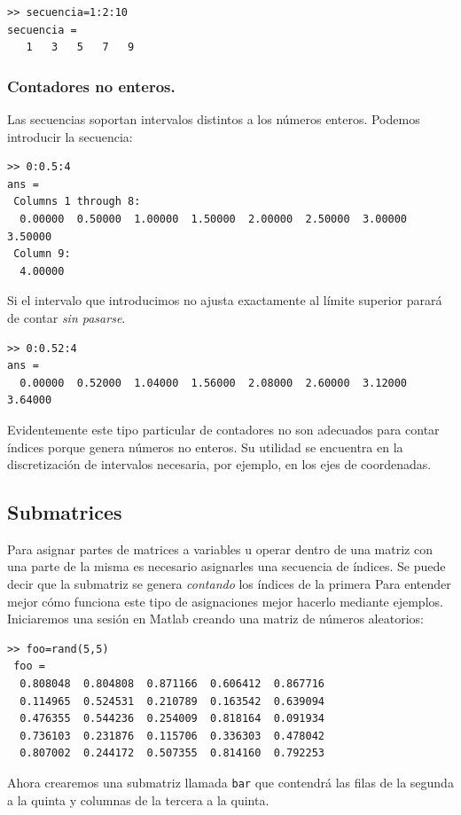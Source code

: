 \begin{lstlisting}
>> secuencia=1:2:10
secuencia =
   1   3   5   7   9
\end{lstlisting}


\subsubsection{Contadores no enteros.}

Las secuencias soportan intervalos distintos a los números enteros.
Podemos introducir la secuencia:

\begin{lstlisting}
>> 0:0.5:4
ans =
 Columns 1 through 8:
  0.00000  0.50000  1.00000  1.50000  2.00000  2.50000  3.00000  3.50000
 Column 9:
  4.00000
\end{lstlisting}

Si el intervalo que introducimos no ajusta exactamente al límite
superior parará de contar \emph{sin pasarse}.

\begin{lstlisting}
>> 0:0.52:4
ans =
  0.00000  0.52000  1.04000  1.56000  2.08000  2.60000  3.12000  3.64000
\end{lstlisting}
Evidentemente este tipo particular de contadores no son adecuados para
contar índices porque genera números no enteros. Su utilidad
se encuentra en la discretización de intervalos necesaria, por ejemplo,
en los ejes de coordenadas.


\subsection{Submatrices}

Para asignar partes de matrices a variables u operar dentro de una
matriz con una parte de la misma es necesario asignarles una secuencia
de índices. Se puede decir que la submatriz se genera \emph{contando}
los índices de la primera Para entender mejor cómo funciona este tipo
de asignaciones mejor hacerlo mediante ejemplos. Iniciaremos una
sesión en Matlab creando una matriz de números aleatorios:

\begin{lstlisting}
>> foo=rand(5,5)
 foo =
  0.808048  0.804808  0.871166  0.606412  0.867716
  0.114965  0.524531  0.210789  0.163542  0.639094
  0.476355  0.544236  0.254009  0.818164  0.091934
  0.736103  0.231876  0.115706  0.336303  0.478042
  0.807002  0.244172  0.507355  0.814160  0.792253
\end{lstlisting}
Ahora crearemos una submatriz llamada \texttt{bar} que contendrá las
filas de la segunda a la quinta y columnas de la tercera a la quinta.


